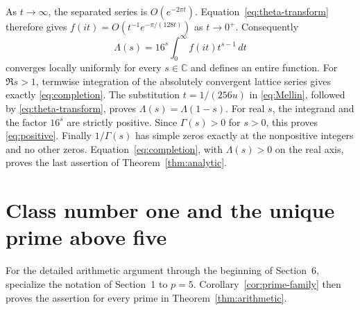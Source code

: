 \documentclass[11pt]{article}
\newcommand{\C}{\mathbb C}
\begin{document}
As $t\to\infty$, the separated series is $O(e^{-2\pi t})$.
Equation~\eqref{eq:theta-transform} therefore gives
$f(it)=O(t^{-1}e^{-\pi/(128t)})$ as $t\to0^+$.
Consequently
\[
 \Lambda(s)=16^s\int_0^\infty f(it)t^{s-1}\,dt
 \tag{20}\label{eq:Mellin}
\]
converges locally uniformly for every $s\in\C$ and defines an entire
function. For $\Re s>1$, termwise integration of the absolutely
convergent lattice series gives exactly \eqref{eq:completion}.
The substitution $t=1/(256u)$ in \eqref{eq:Mellin}, followed by
\eqref{eq:theta-transform}, proves
$\Lambda(s)=\Lambda(1-s)$.
For real $s$, the integrand and the factor $16^s$ are strictly positive.
Since $\Gamma(s)>0$ for $s>0$, this proves \eqref{eq:positive}.
Finally $1/\Gamma(s)$ has simple zeros exactly at the nonpositive
integers and no other zeros. Equation~\eqref{eq:completion}, with
$\Lambda(s)>0$ on the real axis, proves the last assertion of
Theorem~\ref{thm:analytic}.

\section{Class number one and the unique prime above five}

For the detailed arithmetic argument through the beginning of
Section~6, specialize the notation of Section~1 to $p=5$.
Corollary~\ref{cor:prime-family} then proves the assertion for every
prime in Theorem~\ref{thm:arithmetic}.
\end{document}
